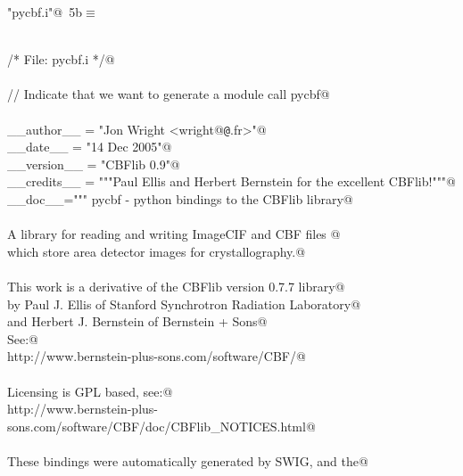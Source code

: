 \documentclass[10pt,a4paper,twoside,notitlepage]{article}
\begin{document}
\begin{flushleft} \small\label{scrap6}\raggedright\small
{} \verb@"pycbf.i"@\nobreak\ {\footnotesize {5b}}$\equiv$
\vspace{-1ex}
\begin{list}{}{} \item
\mbox{}\verb@@\\
\mbox{}\verb@/* File: pycbf.i */@\\
\mbox{}\verb@@\\
\mbox{}\verb@// Indicate that we want to generate a module call pycbf@\\
\mbox{}\verb@%module pycbf@\\
\mbox{}\verb@@\\
\mbox{}\verb@%pythoncode %{@\\
\mbox{}\verb@__author__ = "Jon Wright <wright@{\tt @}\verb@esrf.fr>"@\\
\mbox{}\verb@__date__ = "14 Dec 2005"@\\
\mbox{}\verb@__version__ = "CBFlib 0.9"@\\
\mbox{}\verb@__credits__ = """Paul Ellis and Herbert Bernstein for the excellent CBFlib!"""@\\
\mbox{}\verb@__doc__=""" pycbf - python bindings to the CBFlib library@\\
\mbox{}\verb@@\\
\mbox{}\verb@ A library for reading and writing ImageCIF and CBF files @\\
\mbox{}\verb@ which store area detector images for crystallography.@\\
\mbox{}\verb@@\\
\mbox{}\verb@ This work is a derivative of the CBFlib version 0.7.7 library@\\
\mbox{}\verb@ by  Paul J. Ellis of Stanford Synchrotron Radiation Laboratory@\\
\mbox{}\verb@ and Herbert J. Bernstein of Bernstein + Sons@\\
\mbox{}\verb@ See:@\\
\mbox{}\verb@   http://www.bernstein-plus-sons.com/software/CBF/@\\
\mbox{}\verb@@\\
\mbox{}\verb@ Licensing is GPL based, see:@\\
\mbox{}\verb@   http://www.bernstein-plus-sons.com/software/CBF/doc/CBFlib_NOTICES.html@\\
\mbox{}\verb@@\\
\mbox{}\verb@ These bindings were automatically generated by SWIG, and the@\\

\end{list}
\end{flushleft}
\end{document}
